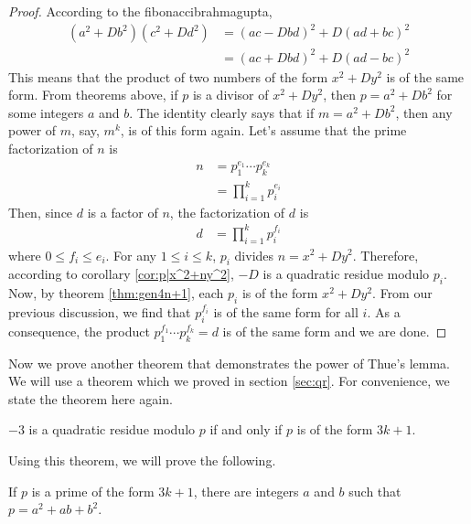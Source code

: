 \documentclass{subfile}
\begin{document}
	\begin{proof}
		According to the \gls{fibonaccibrahmagupta},
			\begin{align*}
				(a^2+Db^2)(c^2+Dd^2)& =(ac-Dbd)^2+D(ad+bc)^2\\
				& =(ac+Dbd)^2+D(ad-bc)^2
			\end{align*}
		This means that the product of two numbers of the form $x^2+Dy^2$ is of the same form. From theorems above, if $p$ is a divisor of $x^2+Dy^2$, then $p=a^2+Db^2$ for some integers $a$ and $b$. The identity clearly says that if $m=a^2+Db^2$, then any power of $m$, say, $m^k$, is of this form again. Let's assume that the prime factorization of $n$ is
			\begin{align*}
				n
					& = p_1^{e_1}\cdots p_k^{e_k}\\
					& = \prod_{i=1}^{k}p_i^{e_i}
			\end{align*}
		Then, since $d$ is a factor of $n$, the factorization of $d$ is
			\begin{align*}
				d & = \prod_{i=1}^{k}p_i^{f_i}
			\end{align*}
		where $0\leq f_i\leq e_i$. For any $1\leq i\leq k$, $p_i$ divides $n=x^2+Dy^2$. Therefore, according to corollary \autoref{cor:p|x^2+ny^2}, $-D$ is a quadratic residue modulo $p_i$. Now, by theorem \autoref{thm:gen4n+1}, each $p_i$ is of the form $x^2+Dy^2$. From our previous discussion, we find that $p_i^{f_i}$ is of the same form for all $i$. As a consequence, the product $p_1^{f_1}\cdots p_k^{f_k}=d$ is of the same form and we are done.
	\end{proof}
	Now we prove another theorem that demonstrates the power of Thue's lemma. We will use a theorem which we proved in section \autoref{sec:qr}. For convenience, we state the theorem here again.
		\begin{theorem}
			$-3$ is a quadratic residue modulo $p$ if and only if $p$ is of the form $3k+1$.
		\end{theorem}
	Using this theorem, we will prove the following.
		\begin{theorem}
			If $p$ is a prime of the form $3k+1$, there are integers $a$ and $b$ such that $p=a^2+ab+b^2$.
		\end{theorem}
\end{document}
